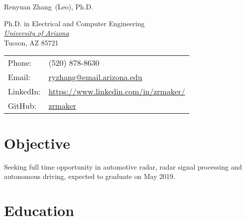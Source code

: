 \documentclass[letterpaper,9pt]{article}
\def\name{Renyuan Zhang}
\renewenvironment{itemize}{
  \begin{list}{}{
    \setlength{\topsep}{0pt}
    \setlength{\itemsep}{0pt}
    \setlength{\parsep}{0pt}
    \setlength{\partopsep}{0pt}
    \setlength{\leftmargin}{1.5em}
  }
}{\end{list}}
\begin{document}
{\huge \name \textnormal \ (Leo), Ph.D.}

\vspace{1em}

\begin{minipage}{0.55\linewidth}
  Ph.D. in Electrical and Computer Engineering \\
  \href{http://www.arizona.edu/}{\it University of Arizona} \\
  Tucson, AZ 85721
\end{minipage}
\begin{minipage}{0.4\linewidth}
  \begin{tabular}{ll}
    Phone: & (520) 878-8630 \\
    Email: & \href{mailto:ryzhang@email.arizona.edu}{ryzhang@email.arizona.edu} \\
    LinkedIn: & \href{https://www.linkedin.com/in/zrmaker/}{https://www.linkedin.com/in/zrmaker/} \\
    GitHub: & \href{https://github.com/zrmaker}{zrmaker}
  \end{tabular}
\end{minipage}

%

\section*{Objective}
\begin{itemize}
  \item Seeking full time opportunity in automotive radar, radar signal processing and autonomous driving, expected to graduate on May 2019.
\end{itemize}

\section*{Education}
\end{document}

